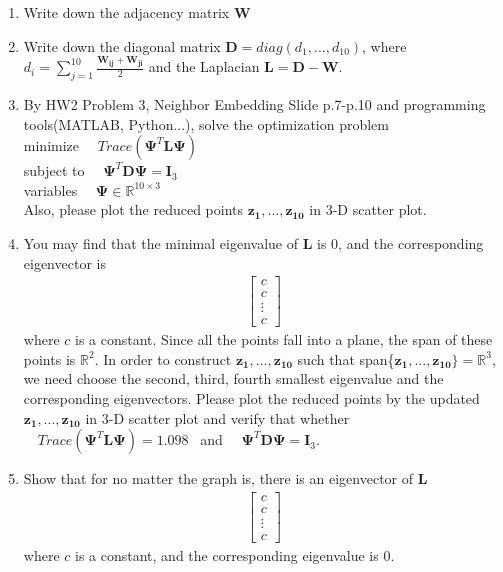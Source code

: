 \documentclass{article}
\begin{document}
\begin{enumerate}
    \item Write down the adjacency matrix $\boldsymbol{W}$
    \item Write down the diagonal matrix $\boldsymbol{D}=diag(d_1,...,d_{10})$, where $d_i=\sum_{j=1}^{10} \frac{\boldsymbol{W_{ij}}+\boldsymbol{W_{ji}}}{2}$ and the Laplacian $\boldsymbol{L}=\boldsymbol{D}-\boldsymbol{W}$.
    \item By HW2 Problem 3, Neighbor Embedding Slide p.7-p.10 and programming tools(MATLAB, Python...), solve the optimization problem \\
minimize  $\quad Trace(\boldsymbol{\Psi}^T \boldsymbol{L} \boldsymbol{\Psi})$ \\ 
subject to $\quad \boldsymbol{\Psi}^T \boldsymbol{D} \boldsymbol{\Psi} = \boldsymbol{I}_3$ \\
variables $\quad \boldsymbol{\Psi} \in \mathbb{R}^{10 \times 3}$ \\
Also, please plot the reduced points $\boldsymbol{z_1},...,\boldsymbol{z_{10}}$ in 3-D scatter plot.
\item You may find that the minimal eigenvalue of $\boldsymbol{L}$ is 0, and the corresponding eigenvector is 
\begin{align}
    \begin{bmatrix}
       c \\
       c \\
       \vdots \\
       c
     \end{bmatrix}
  \end{align}
  where $c$ is a constant. Since all the points fall into a plane, the span of these points is $\mathbb{R}^2$. In order to construct $\boldsymbol{z_1},...,\boldsymbol{z_{10}}$ such that span\{$\boldsymbol{z_1},...,\boldsymbol{z_{10}}\}=\mathbb{R}^3$, we need choose the second, third, fourth smallest eigenvalue and the corresponding eigenvectors. Please plot the reduced points by the updated $\boldsymbol{z_1},...,\boldsymbol{z_{10}}$ in 3-D scatter plot and verify that whether 
$\quad Trace(\boldsymbol{\Psi}^T \boldsymbol{L} \boldsymbol{\Psi})=1.098$ \ and $\quad \boldsymbol{\Psi}^T \boldsymbol{D} \boldsymbol{\Psi} = \boldsymbol{I}_3$.

\item Show that for no matter the graph is, there is an eigenvector of $\boldsymbol{L}$ 
\begin{align}
    \begin{bmatrix}
       c \\
       c \\
       \vdots \\
       c
     \end{bmatrix}
  \end{align}
  where $c$ is a constant, and the corresponding eigenvalue is 0.


\end{enumerate}
\end{document}
